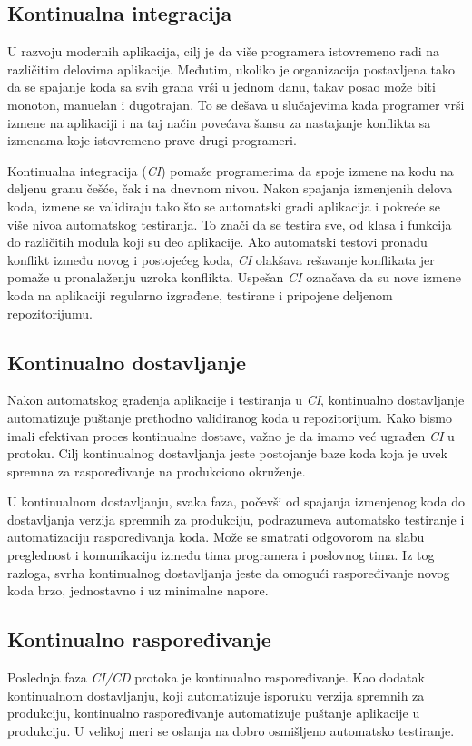 \subsection{Kontinualna integracija}
U razvoju modernih aplikacija, cilj je da više programera istovremeno radi na različitim delovima 
aplikacije. Međutim, ukoliko je organizacija postavljena tako da se spajanje koda sa svih grana 
vrši u jednom danu, takav posao može biti monoton, manuelan i dugotrajan. To se dešava u slučajevima 
kada programer vrši izmene na aplikaciji i na taj način povećava šansu za nastajanje konflikta sa 
izmenama koje istovremeno prave drugi programeri.

Kontinualna integracija (\textit{CI}) pomaže programerima da spoje izmene na kodu na deljenu granu češće, 
čak i na dnevnom nivou. Nakon spajanja izmenjenih delova koda, izmene se validiraju tako što se 
automatski gradi aplikacija i pokreće se više nivoa automatskog testiranja. To znači da se testira 
sve, od klasa i funkcija do različitih modula koji su deo aplikacije. Ako automatski testovi pronađu 
konflikt između novog i postojećeg koda, \textit{CI} olakšava rešavanje konflikata jer pomaže u 
pronalaženju uzroka konflikta. Uspešan \textit{CI} označava da su nove izmene koda 
na aplikaciji regularno izgrađene, testirane i pripojene deljenom repozitorijumu.

\subsection{Kontinualno dostavljanje}
Nakon automatskog građenja aplikacije i testiranja u \textit{CI}, kontinualno dostavljanje automatizuje 
puštanje prethodno validiranog koda u repozitorijum. Kako bismo imali efektivan proces kontinualne 
dostave, važno je da imamo već ugrađen \textit{CI} u protoku. Cilj kontinualnog dostavljanja jeste postojanje 
baze koda koja je uvek spremna za raspoređivanje na produkciono okruženje.

U kontinualnom dostavljanju, svaka faza, počevši od spajanja izmenjenog koda do dostavljanja 
verzija spremnih za produkciju, podrazumeva automatsko testiranje i automatizaciju raspoređivanja 
koda. Može se smatrati odgovorom na slabu preglednost i komunikaciju između tima 
programera i poslovnog tima. Iz tog razloga, svrha kontinualnog dostavljanja jeste da omogući 
raspoređivanje novog koda brzo, jednostavno i uz minimalne napore.

\subsection{Kontinualno raspoređivanje}
Poslednja faza \textit{CI/CD} protoka je kontinualno raspoređivanje. Kao dodatak kontinualnom dostavljanju, 
koji automatizuje isporuku verzija spremnih za produkciju, kontinualno raspoređivanje automatizuje 
puštanje aplikacije u produkciju. U velikoj meri se oslanja na dobro osmišljeno automatsko testiranje.

